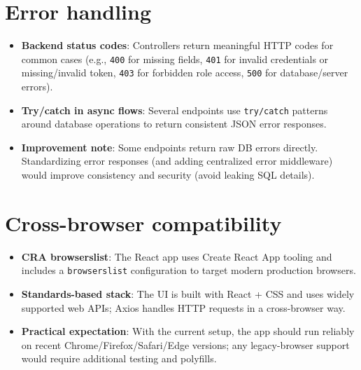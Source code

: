 \documentclass[12pt,a4paper]{article}
\begin{document}
\section{Error handling}
\begin{itemize}[leftmargin=*, itemsep=0.4em]
  \item \textbf{Backend status codes}: Controllers return meaningful HTTP codes for common cases (e.g., \texttt{400} for missing fields, \texttt{401} for invalid credentials or missing/invalid token, \texttt{403} for forbidden role access, \texttt{500} for database/server errors).
  \item \textbf{Try/catch in async flows}: Several endpoints use \texttt{try/catch} patterns around database operations to return consistent JSON error responses.
  \item \textbf{Improvement note}: Some endpoints return raw DB errors directly. Standardizing error responses (and adding centralized error middleware) would improve consistency and security (avoid leaking SQL details).
\end{itemize}

\section{Cross-browser compatibility}
\begin{itemize}[leftmargin=*, itemsep=0.4em]
  \item \textbf{CRA browserslist}: The React app uses Create React App tooling and includes a \texttt{browserslist} configuration to target modern production browsers.
  \item \textbf{Standards-based stack}: The UI is built with React + CSS and uses widely supported web APIs; Axios handles HTTP requests in a cross-browser way.
  \item \textbf{Practical expectation}: With the current setup, the app should run reliably on recent Chrome/Firefox/Safari/Edge versions; any legacy-browser support would require additional testing and polyfills.
\end{itemize}
\end{document}

